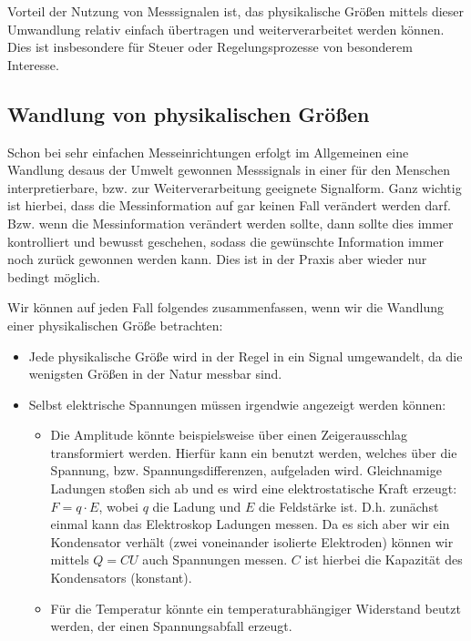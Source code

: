 \documentclass[letterpaper,10pt,english]{jupyterBook}
\begin{document}
\sphinxAtStartPar
Vorteil der Nutzung von Messsignalen ist, das physikalische Größen mittels dieser Umwandlung relativ einfach übertragen und weiterverarbeitet werden können. Dies ist insbesondere für Steuer\sphinxhyphen{} oder Regelungsprozesse von besonderem Interesse.


\subsection{Wandlung von physikalischen Größen }
\label{\detokenize{content/3_basics:wandlung-von-physikalischen-groszen-a-id-subsec-wandlung-von-physikalischen-groszen-a}}
\sphinxAtStartPar
Schon bei sehr einfachen Messeinrichtungen erfolgt im Allgemeinen eine Wandlung desaus der Umwelt gewonnen Messsignals in einer für den Menschen interpretierbare, bzw. zur Weiterverarbeitung geeignete Signalform. Ganz wichtig ist hierbei, dass die Messinformation auf gar keinen Fall verändert werden darf. Bzw. wenn die Messinformation verändert werden sollte, dann sollte dies immer kontrolliert und bewusst geschehen, sodass die gewünschte Information immer noch zurück gewonnen werden kann. Dies ist in der Praxis aber wieder nur bedingt möglich.

\sphinxAtStartPar
Wir können auf jeden Fall folgendes zusammenfassen, wenn wir die Wandlung einer physikalischen Größe betrachten:
\begin{itemize}
\item {} 
\sphinxAtStartPar
Jede physikalische Größe wird in der Regel in ein Signal umgewandelt, da die wenigsten Größen in der Natur  messbar sind.

\item {} 
\sphinxAtStartPar
Selbst elektrische Spannungen müssen irgendwie angezeigt werden können:
\begin{itemize}
\item {} 
\sphinxAtStartPar
Die Amplitude könnte beispielsweise über einen Zeigerausschlag transformiert werden. Hierfür kann ein  benutzt werden, welches über die Spannung, bzw. Spannungsdifferenzen, aufgeladen wird. Gleichnamige Ladungen stoßen sich ab und es wird eine elektrostatische Kraft erzeugt: \(F = q\cdot E\), wobei \(q\) die Ladung und \(E\) die Feldstärke ist. D.h. zunächst einmal kann das Elektroskop Ladungen messen. Da es sich aber wir ein Kondensator verhält (zwei voneinander isolierte Elektroden) können wir mittels \(Q = CU\) auch Spannungen messen. \(C\) ist hierbei die Kapazität des Kondensators (konstant).

\item {} 
\sphinxAtStartPar
Für die Temperatur könnte ein temperaturabhängiger Widerstand beutzt werden, der einen Spannungsabfall erzeugt.

\end{itemize}

\end{itemize}
\end{document}

